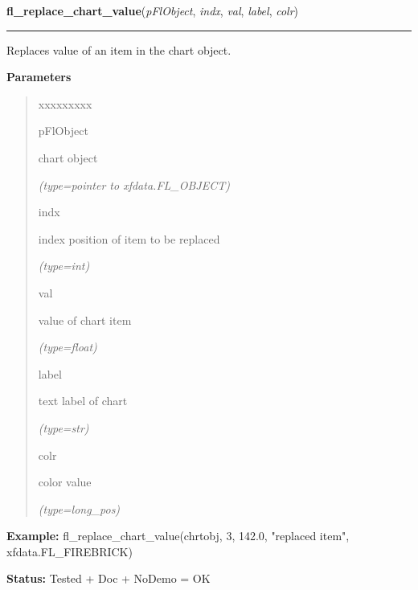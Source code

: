     \label{xformslib:flchart:fl_replace_chart_value}

    \vspace{0.5ex}

\hspace{.8\funcindent}\begin{boxedminipage}{\funcwidth}

    \raggedright \textbf{fl\_replace\_chart\_value}(\textit{pFlObject}, \textit{indx}, \textit{val}, \textit{label}, \textit{colr})

    \vspace{-1.5ex}

    \rule{\textwidth}{0.5\fboxrule}
\setlength{\parskip}{2ex}
    Replaces value of an item in the chart object.

\setlength{\parskip}{1ex}
      \textbf{Parameters}
      \vspace{-1ex}

      \begin{quote}
        \begin{Ventry}{xxxxxxxxx}

          \item[pFlObject]

          chart object

            {\it (type=pointer to xfdata.FL\_OBJECT)}

          \item[indx]

          index position of item to be replaced

            {\it (type=int)}

          \item[val]

          value of chart item

            {\it (type=float)}

          \item[label]

          text label of chart

            {\it (type=str)}

          \item[colr]

          color value

            {\it (type=long\_pos)}

        \end{Ventry}

      \end{quote}

\textbf{Example:} fl\_replace\_chart\_value(chrtobj, 3, 142.0, "replaced item", 
xfdata.FL\_FIREBRICK)



\textbf{Status:} Tested + Doc + NoDemo = OK



    \end{boxedminipage}

